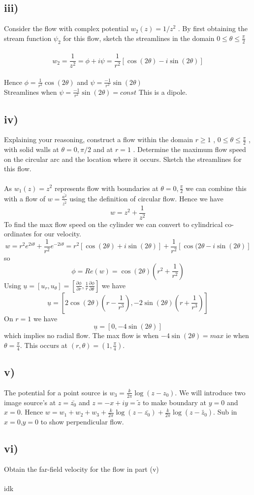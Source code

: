 \documentclass[1pt]{article}
\begin{document}
\subsection{iii)}
Consider the flow with complex potential $w_2(z) = 1/z^2$
. By first obtaining the stream function $\psi_2$ for this flow, sketch the streamlines in
the domain $0\leq \theta \leq \frac{\pi}{2}$
\\
\\ $$w_2=\frac{1}{z^2}=\phi+i\psi=\frac{1}{r^2}[\cos(2\theta)-i\sin(2\theta)]$$ 
\\ Hence $\phi=\frac{1}{r^2}\cos(2\theta)$ and $\psi=\frac{-1}{r^2}\sin(2\theta)$
\\ Streamlines when $\psi=\frac{-1}{r^2}\sin(2\theta)=const$ This is a dipole.
\subsection{iv)}
Explaining your reasoning, construct a flow within the domain $r\geq 1$ ,
$0\leq \theta \leq \frac{\pi}{2}$ , with solid walls at $\theta = 0, \pi/2$ and at $r = 1$ . Determine
the maximum flow speed on the circular arc and the location where it
occurs. Sketch the streamlines for this flow.
\\
\\ As $w_1(z)=z^2$ represents flow with boundaries at $\theta=0,\frac{\pi}{2}$ we can combine this with a flow of $w=\frac{\bar{a^2}}{\bar{z^2}}$ using the definition of circular flow. Hence we have $$w=z^2+\frac{1}{z^2}$$ To find the max flow speed on the cylinder we can convert to cylindrical co-ordinates for our velocity. $$w=r^2e^{2i\theta}+\frac{1}{r^2}e^{-2i\theta}=r^2[\cos(2\theta)+i\sin(2\theta)]+\frac{1}{r^2}[\cos(2\theta-i\sin(2\theta)]$$ so $$\phi=Re(w)=\cos(2\theta)(r^2+\frac{1}{r^2})$$ Using $\underline{u}=[u_r,u_{\theta}]=[\frac{\partial \phi}{\partial r}, \frac{1}{r}\frac{\partial \phi}{\partial \theta}]$ we have $$\underline{u}=[2\cos(2\theta)(r-\frac{1}{r^3}), -2\sin(2\theta)(r+\frac{1}{r^3})]$$ On $r=1$ we have $$\underline{u}=[0,-4\sin(2\theta)]$$ which implies no radial flow. The max flow is when $-4\sin(2\theta)=max$ ie when $\theta=\frac{\pi}{4}$. This occurs at $(r,\theta)=(1,\frac{\pi}{4})$.
\subsection{v)}
The potential for a point source is $w_3=\frac{k}{2\pi}\log(z-z_0)$. We will introduce two image source's at $z=\bar{z_0}$ and $z=-x+iy=\tilde{z}$ to make boundary at $y=0$ and $x=0$. Hence $w=w_1+w_2+w_3+\frac{k}{2\pi}\log(z-\bar{z_0})+\frac{k}{2\pi}\log(z-\tilde{z_0})$. Sub in $x=0$,$y=0$ to show perpendicular flow.
\subsection{vi)}
Obtain the far-field velocity for the flow in part (v)
\\
\\ idk
\end{document}
